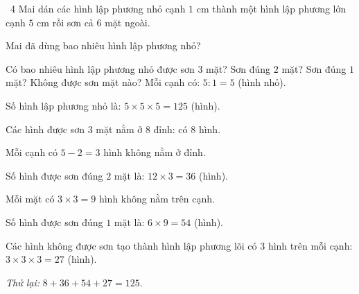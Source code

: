 \begin{exbox}{\ExWord\ 4}
Mai dán các hình lập phương nhỏ cạnh $1$ cm thành một hình lập phương lớn cạnh $5$ cm rồi sơn cả $6$ mặt ngoài.\par
{} Mai đã dùng bao nhiêu hình lập phương nhỏ?\par
{} Có bao nhiêu hình lập phương nhỏ được sơn $3$ mặt? Sơn đúng $2$ mặt? Sơn đúng $1$ mặt? Không được sơn mặt nào?
\guide
{} Mỗi cạnh có: $5:1=5$ (hình nhỏ).\par Số hình lập phương nhỏ là: $5\times5\times5=125$ (hình).\par
{} Các hình được sơn $3$ mặt nằm ở $8$ đỉnh: có $8$ hình.\par
Mỗi cạnh có $5-2=3$ hình không nằm ở đỉnh.\par
Số hình được sơn đúng $2$ mặt là: $12\times3=36$ (hình).\par
Mỗi mặt có $3\times3=9$ hình không nằm trên cạnh.\par
Số hình được sơn đúng $1$ mặt là: $6\times9=54$ (hình).\par
Các hình không được sơn tạo thành hình lập phương lõi có $3$ hình trên mỗi cạnh: $3\times3\times3=27$ (hình).\par
\emph{Thử lại:} $8+36+54+27=125$.
\end{exbox}
\gap
